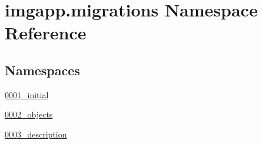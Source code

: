 \hypertarget{namespaceimgapp_1_1migrations}{}\section{imgapp.\+migrations Namespace Reference}
\label{namespaceimgapp_1_1migrations}
\subsection*{Namespaces}
\begin{DoxyCompactItemize}
\item 
 \hyperlink{namespaceimgapp_1_1migrations_1_10001__initial}{0001\+\_\+initial}
\item 
 \hyperlink{namespaceimgapp_1_1migrations_1_10002__objects}{0002\+\_\+objects}
\item 
 \hyperlink{namespaceimgapp_1_1migrations_1_10003__description}{0003\+\_\+description}
\end{DoxyCompactItemize}
